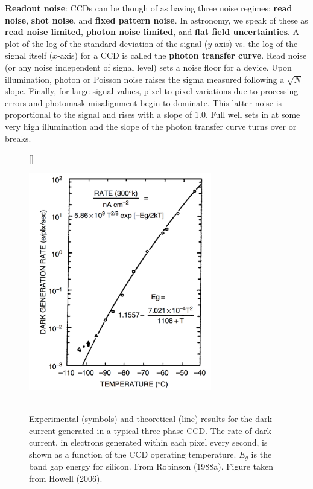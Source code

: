 \documentclass[a4paper,10pt]{article}
\begin{document}
{\noindent}\textbf{Readout noise}: CCDs can be though of as having three noise regimes: \textbf{read noise}, \textbf{shot noise}, and \textbf{fixed pattern noise}. In astronomy, we speak of these as \textbf{read noise limited}, \textbf{photon noise limited}, and \textbf{flat field uncertainties}. A plot of the log of the standard deviation of the signal ($y$-axis) vs. the log of the signal itself ($x$-axis) for a CCD is called the \textbf{photon transfer curve}. Read noise (or any noise independent of signal level) sets a noise floor for a device. Upon illumination, photon or Poisson noise raises the sigma measured following a $\sqrt{N}$ slope. Finally, for large signal values, pixel to pixel variations due to processing errors and photomask misalignment begin to dominate. This latter noise is proportional to the signal and rises with a slope of $1.0$. Full well sets in at some very high illumination and the slope of the photon transfer curve turns over or breaks.

\begin{figure}[t]
    [\FBwidth]
    {\caption{\footnotesize{\\Experimental (symbols) and theoretical (line) results for the dark current generated in a typical three-phase CCD. The rate of dark current, in electrons generated within each pixel every second, is shown as a function of the CCD operating temperature. $E_g$ is the band gap energy for silicon. From Robinson (1988a). Figure taken from Howell (2006).}}
    \label{fig:ccddarkcurrent}}
    {\includegraphics[width=8cm]{figures/CCD_darkcurrent.png}}
\end{figure}
\end{document}
